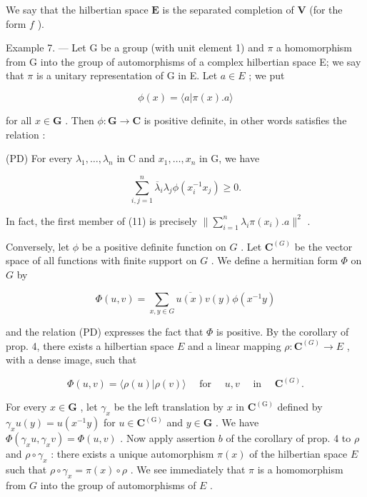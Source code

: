 We say that the hilbertian space \(\mathbf{E}\) is the separated completion of \(\mathbf{V}\) (for the form \(f\) ).

Example 7. --- Let G be a group (with unit element 1) and \(\pi\) a homomorphism from G into the group of automorphisms of a complex hilbertian space E; we say that \(\pi\) is a unitary representation of G in E. Let \(a \in E\) ; we put

\[
\phi (x) = \langle a | \pi (x). a \rangle
\]

for all \(x \in \mathbf{G}\) . Then \(\phi : \mathbf{G} \to \mathbf{C}\) is positive definite, in other words satisfies the relation :

(PD) For every \(\lambda_{1},\ldots,\lambda_{n}\) in C and \(x_{1},\ldots,x_{n}\) in G, we have

\[
\sum_ {i, j = 1} ^ {n} \overline {{\lambda}} _ {i} \lambda_ {j} \phi (x _ {i} ^ {- 1} x _ {j}) \geqslant 0.\tag{11}
\]

In fact, the first member of (11) is precisely \(\| \sum_{i=1}^{n} \lambda_i \pi(x_i). a \|^2\) .

Conversely, let \(\phi\) be a positive definite function on \(G\) . Let \(\mathbf{C}^{(G)}\) be the vector space of all functions with finite support on \(G\) . We define a hermitian form \(\Phi\) on \(G\) by

\[
\Phi (u, v) = \sum_ {x, y \in G} \overline {{u (x)}} v (y) \phi (x ^ {- 1} y)\tag{12}
\]

and the relation (PD) expresses the fact that \(\Phi\) is positive. By the corollary of prop. 4, there exists a hilbertian space \(E\) and a linear mapping \(\rho : \mathbf{C}^{(G)} \to E\) , with a dense image, such that

\[
\Phi (u, v) = \langle \rho (u) | \rho (v) \rangle \quad \text { for } \quad u, v \quad \text { in } \quad \mathbf {C} ^ {(G)}.\tag{13}
\]

For every \(x \in \mathbf{G}\) , let \(\gamma_x\) be the left translation by \(x\) in \(\mathbf{C}^{(\mathrm{G})}\) defined by \(\gamma_x u(y) = u(x^{-1}y)\) for \(u \in \mathbf{C}^{(\mathrm{G})}\) and \(y \in \mathbf{G}\) . We have \(\Phi(\gamma_x u, \gamma_x v) = \Phi(u, v)\) . Now apply assertion \(b\) of the corollary of prop. 4 to \(\rho\) and \(\rho \circ \gamma_x\) : there exists a unique automorphism \(\pi(x)\) of the hilbertian space \(E\) such that \(\rho \circ \gamma_x = \pi(x) \circ \rho\) . We see immediately that \(\pi\) is a homomorphism from \(G\) into the group of automorphisms of \(E\) .

